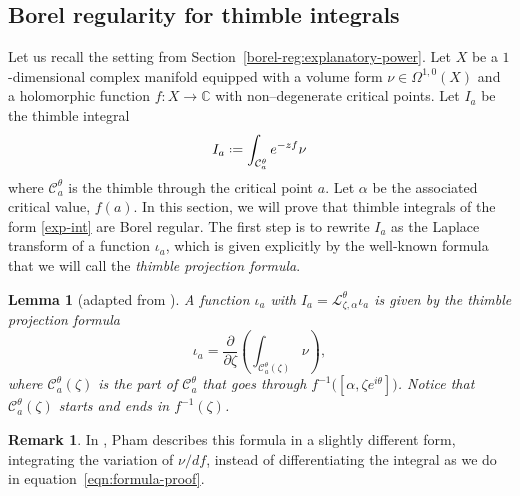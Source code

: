 \documentclass{article}
\newcommand{\C}{\mathbb{C}}
\newcommand*{\defeq}{\mathrel{\vcenter{\baselineskip0.5ex \lineskiplimit0pt
                     \hbox{\scriptsize.}\hbox{\scriptsize.}}}%
                     =}
\newcommand{\laplace}{\mathcal{L}}
\theoremstyle{definition}
\newtheorem{remark}[definition]{Remark}
\theoremstyle{plain}
\newtheorem{lemma}[definition]{Lemma}
\begin{document}
\subsection{Borel regularity for thimble integrals}\label{borel-reg-thimble}
%
Let us recall the setting from Section~\ref{borel-reg:explanatory-power}. Let $X$ be a $1$-dimensional complex manifold equipped with a volume form $\nu \in \Omega^{1,0}(X)$ and a holomorphic function $f\colon X\to\C$ with non--degenerate critical points. Let $I_a$ be the thimble integral 
\begin{equation}\label{exp-int}
I_a \defeq \int_{\mathcal{C}_a^\theta} e^{-zf} \nu
\end{equation}
where $\mathcal{C}_a^\theta$ is the thimble through the critical point $a$. Let $\alpha$ be the associated critical value, $f(a)$. In this section, we will prove that thimble integrals of the form \eqref{exp-int} are Borel regular. The first step is to rewrite $I_a$ as the Laplace transform of a function $\iota_a$, which is given explicitly by the well-known formula that we will call the \textit{thimble projection formula}.
%
\begin{lemma}[adapted from {\cite[Section~3.3]{pham}}]\label{lem:thimble_proj_formula-proof}
A function $\iota_a$ with $I_a = \laplace_{\zeta, \alpha}^\theta \iota_a$ is given by the {\em thimble projection formula}
\begin{equation}\label{eqn:formula-proof}
\iota_a = \frac{\partial}{\partial \zeta} \left( \int_{\mathcal{C}_a^\theta(\zeta)}\nu \right),
\end{equation}
where $\mathcal{C}_a^\theta(\zeta)$ is the part of $\mathcal{C}_a^\theta$ that goes through $f^{-1}\big([\alpha,\zeta e^{i\theta}]\big)$. Notice that $\mathcal{C}_a^\theta(\zeta)$ starts and ends in $f^{-1}(\zeta)$.
\end{lemma}
\begin{remark}
In \cite{pham}, Pham describes this formula in a slightly different form, integrating the variation of $\nu/df$, instead of differentiating the integral as we do in equation~\eqref{eqn:formula-proof}.
\end{remark}
\end{document}
